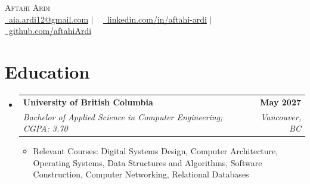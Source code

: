\documentclass[letterpaper,11pt]{article}
\makeatletter
\newcommand{\resumeItem}[1]{
  \item\small{
    {#1 \vspace{-2pt}}
  }
}
\newcommand{\resumeSubheading}[4]{
  \vspace{-2pt}\item
    \begin{tabular*}{1.0\textwidth}[t]{l@{\extracolsep{\fill}}r}
      \textbf{#1} & \textbf{\small #2} \\
      \textit{\small#3} & \textit{\small #4} \\
    \end{tabular*}\vspace{-7pt}
}
\newcommand{\resumeSubHeadingListStart}{\begin{itemize}[leftmargin=0.0in, label={}]}
\newcommand{\resumeSubHeadingListEnd}{\end{itemize}}
\newcommand{\resumeItemListStart}{\begin{itemize}}
\newcommand{\resumeItemListEnd}{\end{itemize}\vspace{-5pt}}
\makeatother
\begin{document}



\begin{center}
    {\Huge \scshape Aftahi Ardi} \\ \vspace{1pt}
    \small \href{mailto:x@gmail.com}{\raisebox{-0.2\height}\faEnvelope\ aia.ardi12@gmail.com} $\mid$ ~
    \href{https://linkedin.com/in//}{\raisebox{-0.2\height}\faLinkedin\ linkedin.com/in/aftahi-ardi} $\mid$ ~
    \href{https://github.com/aftahiArdi}{\raisebox{-0.2\height}\faGithub\ github.com/aftahiArdi}
    \vspace{-10pt}
\end{center}




\section{Education}
  \resumeSubHeadingListStart
    \resumeSubheading
    {University of British Columbia}{May 2027}
      {Bachelor of Applied Science in Computer Engineering; CGPA: 3.70}{Vancouver, BC}
    \resumeItemListStart
        \resumeItem{Relevant Courses: Digital Systems Design, Computer Architecture, Operating Systems, Data Structures and Algorithms, Software Construction, Computer Networking, Relational Databases}
    \resumeItemListEnd
\resumeSubHeadingListEnd



\vspace{-18pt}

\end{document}
